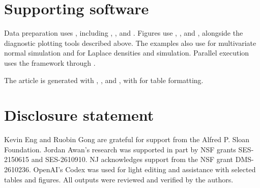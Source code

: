 \section*{Supporting software}\label{supporting-software}

Data preparation uses  \citep{tidyverse_pkg}, including
 \citep{dplyr_pkg},  \citep{tibble_pkg}, and
 \citep{tidyr_pkg}. Figures use  \citep{ggplot2_pkg},
 \citep{ggsci_pkg}, and  \citep{scales_pkg}, alongside
the diagnostic plotting tools described above. The examples also use
 \citep{MASS_pkg} for multivariate normal simulation and
 \citep{VGAM_pkg} for Laplace densities and simulation. Parallel
execution uses the  framework \citep{future_pkg} through
.

The article is generated with  \citep{rmarkdown_pkg},
 \citep{knitr_pkg}, and  \citep{rjtools_pkg}, with
 \citep{kableExtra_pkg} for table formatting.

\section*{Disclosure statement}\label{disclosure-statement}

Kevin Eng and Ruobin Gong are grateful for support from the Alfred P. Sloan Foundation. Jordan Awan's research was supported in part by NSF grants SES-2150615 and SES-2610910. NJ acknowledges support from the NSF grant DMS-2610236. OpenAI's Codex was used for light editing and assistance with selected tables and figures. All outputs were reviewed and verified by the authors.



\address{%
Kevin Eng\\
Rutgers University\\%
Department of Statistics\\ Piscataway, NJ 08854\\
%
%
%
\href{mailto:ke157@stat.rutgers.edu}{\nolinkurl{ke157@stat.rutgers.edu}}%
}

\address{%
Jordan A. Awan\\
University of Pittsburgh\\%
Department of Statistics\\ Pittsburgh, PA 15260\\
%
\url{https://jordan-awan.com/}\\%
%
\href{mailto:jaa557@pitt.edu}{\nolinkurl{jaa557@pitt.edu}}%
}

